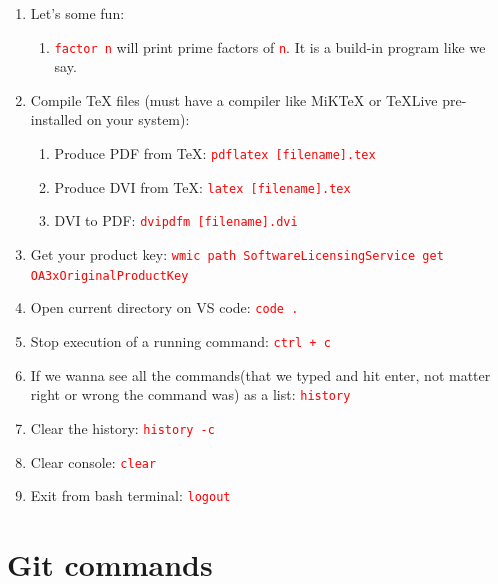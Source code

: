 \documentclass[12 pt, letterpaper]{extarticle}
\newcommand{\R}{\textcolor{red}} %
\newcommand{\T}{\texttt}
\begin{document}
\begin{enumerate}
	\item Let's some fun:
	      \begin{enumerate}
		      \item \R{\T{factor n}} will print prime factors of \R{\T{n}}. It is a build-in program like we say.
	      \end{enumerate}

	\item Compile TeX files (must have a compiler like MiKTeX or TeXLive pre-installed on your system):
	      \begin{enumerate}
		      \item Produce PDF from TeX: \R{\T{pdflatex [filename].tex}}
		      \item Produce DVI from TeX: \R{\T{latex [filename].tex}}
		      \item DVI to PDF: \R{\T{dvipdfm [filename].dvi}}
	      \end{enumerate}

	\item Get your product key: \R{\T{wmic path SoftwareLicensingService get OA3xOriginalProductKey}}

	\item Open current directory on VS code: \R{\T{code .}}
	\item Stop execution of a running command: \R{\T{ctrl + c}}
	\item If we wanna see all the commands(that we typed and hit enter, not matter right or wrong the command was) as a list: \R{\T{history}}
	\item Clear the history: \R{\T{history -c}}
	\item Clear console: \R{\T{clear}}
	\item Exit from bash terminal: \R{\T{logout}}
\end{enumerate}

\section*{Git commands}
\end{document}
